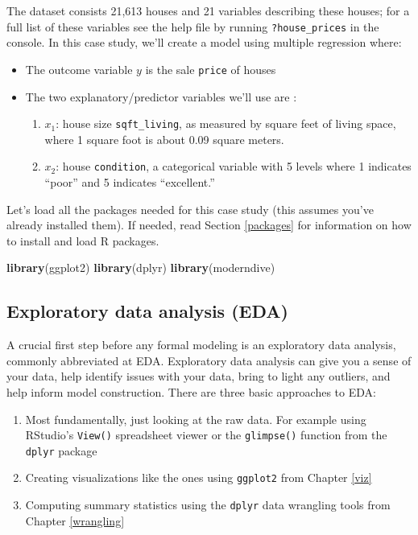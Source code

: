 \documentclass[12pt, krantz2,]{krantz}
\makeatletter
\newenvironment{Shaded}{\begin{snugshade}}{\end{snugshade}}
\newcommand{\KeywordTok}[1]{\textcolor[rgb]{0.27,0.27,0.27}{\textbf{#1}}}
\newcommand{\NormalTok}[1]{#1}
\providecommand{\tightlist}{%
  \setlength{\itemsep}{0pt}\setlength{\parskip}{0pt}}
\newenvironment{kframe}{%
\medskip{}
\setlength{\fboxsep}{.8em}
 \def\at@end@of@kframe{}%
 \ifinner\ifhmode%
  \def\at@end@of@kframe{\end{minipage}}%
  \begin{minipage}{\columnwidth}%
 \fi\fi%
 \def\FrameCommand##1{\hskip\@totalleftmargin \hskip-\fboxsep
 \colorbox{shadecolor}{##1}\hskip-\fboxsep
     \hskip-\linewidth \hskip-\@totalleftmargin \hskip\columnwidth}%
 \MakeFramed {\advance\hsize-\width
   \@totalleftmargin\z@ \linewidth\hsize
   \@setminipage}}%
 {\par\unskip\endMakeFramed%
 \at@end@of@kframe}
\renewenvironment{Shaded}{\begin{kframe}}{\end{kframe}}
\makeatother
\begin{document}
The dataset consists 21,613 houses and 21 variables describing these houses; for a full list of these variables see the help file by running \texttt{?house\_prices} in the console. In this case study, we'll create a model using multiple regression where:

\begin{itemize}
\tightlist
\item
  The outcome variable \(y\) is the sale \texttt{price} of houses
\item
  The two explanatory/predictor variables we'll use are :

  \begin{enumerate}
  \def\labelenumi{\arabic{enumi}.}
  \tightlist
  \item
    \(x_1\): house size \texttt{sqft\_living}, as measured by square feet of living space, where 1 square foot is about 0.09 square meters.
  \item
    \(x_2\): house \texttt{condition}, a categorical variable with 5 levels where 1 indicates ``poor'' and 5 indicates ``excellent.''
  \end{enumerate}
\end{itemize}

Let's load all the packages needed for this case study (this assumes you've already installed them). If needed, read Section \ref{packages} for information on how to install and load R packages.

\begin{Shaded}
\begin{Highlighting}[]
\KeywordTok{library}\NormalTok{(ggplot2)}
\KeywordTok{library}\NormalTok{(dplyr)}
\KeywordTok{library}\NormalTok{(moderndive)}
\end{Highlighting}
\end{Shaded}

\hypertarget{house-prices-EDA-I}{%
\subsection{Exploratory data analysis (EDA)}\label{house-prices-EDA-I}}

A crucial first step before any formal modeling is an exploratory data analysis, commonly abbreviated at EDA. Exploratory data analysis can give you a sense of your data, help identify issues with your data, bring to light any outliers, and help inform model construction. There are three basic approaches to EDA:

\begin{enumerate}
\def\labelenumi{\arabic{enumi}.}
\tightlist
\item
  Most fundamentally, just looking at the raw data. For example using RStudio's \texttt{View()} spreadsheet viewer or the \texttt{glimpse()} function from the \texttt{dplyr} package
\item
  Creating visualizations like the ones using \texttt{ggplot2} from Chapter \ref{viz}
\item
  Computing summary statistics using the \texttt{dplyr} data wrangling tools from Chapter \ref{wrangling}
\end{enumerate}
\end{document}
